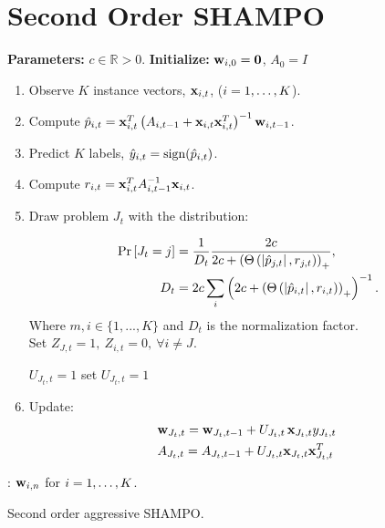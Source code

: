 \chapter{Second Order SHAMPO}

\begin{algorithm}
\begin{algorithmic}
   \State \textbf{Parameters:}  $c\in\mathbb{R}>0$.
   \State \textbf{Initialize:} $\mathbf{w}_{i,0}={\boldsymbol{0}}$, $A_0=I$ \\
     \begin{enumerate}
     \nolineskips
     \item Observe $K$ instance vectors, $\mathbf{x}_{i,t}$, ($i=1 , \ldots , K$).
     \item Compute  $\hat{p}_{i,t}=\mathbf{x}_{i,t}^T \left({A_{i,t-1}+\mathbf{x}_{i,t}\mathbf{x}_{i,t}^T}\right)^{-1}\mathbf{w}_{i,t-1}$.
     \item Predict $K$ labels, $\hat{y}_{i,t}={\rm sign}(\hat{p}_{i,t})$.
      \item Compute $r_{i,t} = \mathbf{x}_{i,t}^T A_{i,t-1}^{-1}\mathbf{x}_{i,t}$.
     \item Draw problem $J_t$  with the distribution:
     
      \begin{align}
     {\rm Pr}\left[{J_t=j}\right] &=
     \frac{1}{D_{t}}\frac{2c}{2c+\left({\Theta\left({\left\vert{\hat{p}_{j,t}}\right\vert,r_{j,t}}\right)}\right)_+}, \nonumber\\
     D_t &=2c
     \sum_i \left({2c+\left({\Theta\left({\left\vert{\hat{p}_{i,t}}\right\vert,r_{i,t}}\right)}\right)_+}\right)^{-1}. \nonumber
     \end{align}
     Where $m,i\in\{1,...,K\}$ and $D_t$ is the normalization factor. \\
     Set $Z_{J,t}=1,~Z_{i,t}=0 , ~\forall i\ne J $.

     
            \State $U_{J_t,t}=1$
        \EndIf
    \Else 
        \State set $U_{J_t,t}=1$
    \EndIf
     
     \item Update:
     \begin{align}
     &\mathbf{w}_{J_t,t} = \mathbf{w}_{J_t,t-1}+U_{J_t,t}\,  \mathbf{x}_{J_t,t}  y_{J_t,t}\,\label{perc_update}\\
     &A_{J_t,t}=A_{J_t,t-1}+ U_{J_t,t}\mathbf{x}_{J_t,t}\mathbf{x}_{J_t,t}^T\nonumber
     \end{align}

     
     \end{enumerate}
   \EndFor  
   : $\mathbf{w}_{i,n}$ for $i=1 , \ldots , K$.
\end{algorithmic}
\caption{Second order aggressive SHAMPO. \label{alg:SHAMPO}}
\end{algorithm}


